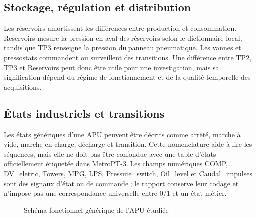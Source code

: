 \subsection{Stockage, régulation et distribution}
Les réservoirs amortissent les différences entre production et consommation. Reservoirs mesure la pression en aval des réservoirs selon le dictionnaire local, tandis que TP3 renseigne la pression du panneau pneumatique. Les vannes et pressostats commandent ou surveillent des transitions. Une différence entre TP2, TP3 et Reservoirs peut donc être utile pour une investigation, mais sa signification dépend du régime de fonctionnement et de la qualité temporelle des acquisitions.

\subsection{États industriels et transitions}
Les états génériques d'une APU peuvent être décrits comme arrêté, marche à vide, marche en charge, décharge et transition. Cette nomenclature aide à lire les séquences, mais elle ne doit pas être confondue avec une table d'états officiellement étiquetée dans MetroPT-3. Les champs numériques COMP, DV\_eletric, Towers, MPG, LPS, Pressure\_switch, Oil\_level et Caudal\_impulses sont des signaux d'état ou de commande ; le rapport conserve leur codage et n'impose pas une correspondance universelle entre 0/1 et un état métier.

\begin{figure}[H]
\centering
{}%
\caption{Schéma fonctionnel générique de l'APU étudiée}
\label{fig:apu}
\end{figure}

